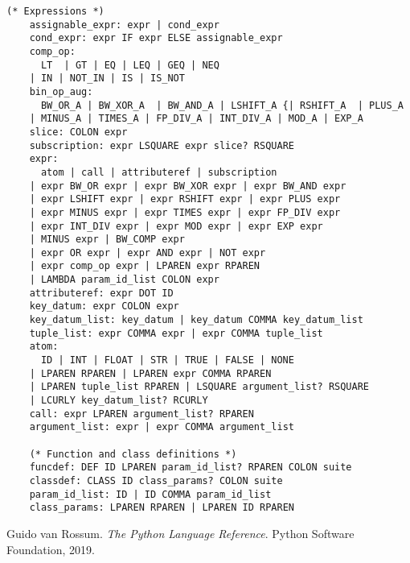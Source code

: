 \documentclass[11pt, twoside]{article}
\begin{document}
\begin{lstlisting}[language=caml]
    (* Expressions *)
    assignable_expr: expr | cond_expr
    cond_expr: expr IF expr ELSE assignable_expr
    comp_op:
      LT  | GT | EQ | LEQ | GEQ | NEQ 
    | IN | NOT_IN | IS | IS_NOT
    bin_op_aug:
      BW_OR_A | BW_XOR_A  | BW_AND_A | LSHIFT_A {| RSHIFT_A  | PLUS_A
    | MINUS_A | TIMES_A | FP_DIV_A | INT_DIV_A | MOD_A | EXP_A
    slice: COLON expr
    subscription: expr LSQUARE expr slice? RSQUARE
    expr:
      atom | call | attributeref | subscription
    | expr BW_OR expr | expr BW_XOR expr | expr BW_AND expr
    | expr LSHIFT expr | expr RSHIFT expr | expr PLUS expr
    | expr MINUS expr | expr TIMES expr | expr FP_DIV expr
    | expr INT_DIV expr | expr MOD expr | expr EXP expr
    | MINUS expr | BW_COMP expr
    | expr OR expr | expr AND expr | NOT expr
    | expr comp_op expr | LPAREN expr RPAREN
    | LAMBDA param_id_list COLON expr
    attributeref: expr DOT ID
    key_datum: expr COLON expr
    key_datum_list: key_datum | key_datum COMMA key_datum_list
    tuple_list: expr COMMA expr | expr COMMA tuple_list
    atom:
      ID | INT | FLOAT | STR | TRUE | FALSE | NONE
    | LPAREN RPAREN | LPAREN expr COMMA RPAREN
    | LPAREN tuple_list RPAREN | LSQUARE argument_list? RSQUARE
    | LCURLY key_datum_list? RCURLY
    call: expr LPAREN argument_list? RPAREN
    argument_list: expr | expr COMMA argument_list

    (* Function and class definitions *)
    funcdef: DEF ID LPAREN param_id_list? RPAREN COLON suite
    classdef: CLASS ID class_params? COLON suite
    param_id_list: ID | ID COMMA param_id_list
    class_params: LPAREN RPAREN | LPAREN ID RPAREN
    \end{lstlisting}

\begin{thebibliography}{1}
     Guido van Rossum. \textit{The Python Language Reference}. Python Software Foundation, 2019.
\end{thebibliography}
\end{document}
